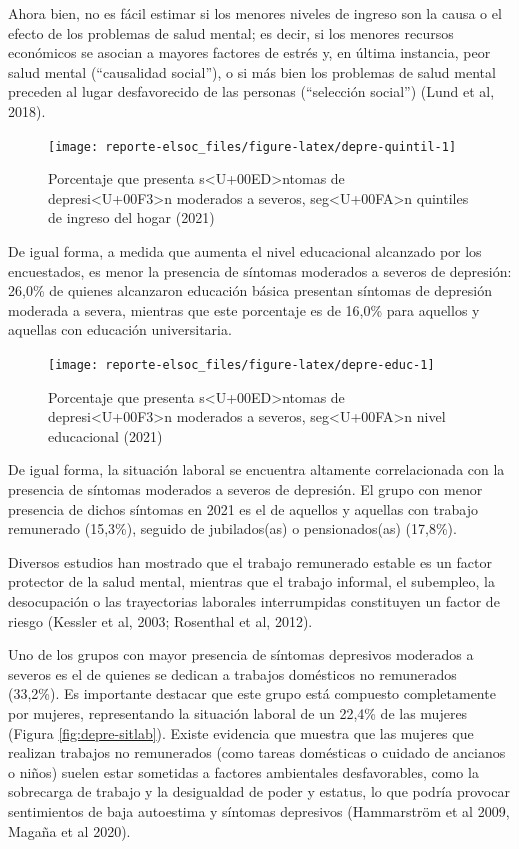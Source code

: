 \documentclass[
  12pt,
]{book}
\begin{document}
Ahora bien, no es fácil estimar si los menores niveles de ingreso son la causa o el efecto de los problemas de salud mental; es decir, si los menores recursos económicos se asocian a mayores factores de estrés y, en última instancia, peor salud mental (``causalidad social''), o si más bien los problemas de salud mental preceden al lugar desfavorecido de las personas (``selección social'') (Lund et al, 2018).

\begin{figure}

{\centering \texttt{[image: reporte-elsoc\_files/figure-latex/depre-quintil-1]} 

}

\caption{Porcentaje que presenta s<U+00ED>ntomas de depresi<U+00F3>n moderados a severos, seg<U+00FA>n quintiles de ingreso del hogar (2021)}\label{fig:depre-quintil}
\end{figure}

De igual forma, a medida que aumenta el nivel educacional alcanzado por los encuestados, es menor la presencia de síntomas moderados a severos de depresión: 26,0\% de quienes alcanzaron educación básica presentan síntomas de depresión moderada a severa, mientras que este porcentaje es de 16,0\% para aquellos y aquellas con educación universitaria.

\begin{figure}

{\centering \texttt{[image: reporte-elsoc\_files/figure-latex/depre-educ-1]} 

}

\caption{Porcentaje que presenta s<U+00ED>ntomas de depresi<U+00F3>n moderados a severos, seg<U+00FA>n nivel educacional (2021)}\label{fig:depre-educ}
\end{figure}

De igual forma, la situación laboral se encuentra altamente correlacionada con la presencia de síntomas moderados a severos de depresión. El grupo con menor presencia de dichos síntomas en 2021 es el de aquellos y aquellas con trabajo remunerado (15,3\%), seguido de jubilados(as) o pensionados(as) (17,8\%).

Diversos estudios han mostrado que el trabajo remunerado estable es un factor protector de la salud mental, mientras que el trabajo informal, el subempleo, la desocupación o las trayectorias laborales interrumpidas constituyen un factor de riesgo (Kessler et al, 2003; Rosenthal et al, 2012).

Uno de los grupos con mayor presencia de síntomas depresivos moderados a severos es el de quienes se dedican a trabajos domésticos no remunerados (33,2\%). Es importante destacar que este grupo está compuesto completamente por mujeres, representando la situación laboral de un 22,4\% de las mujeres (Figura \ref{fig:depre-sitlab}). Existe evidencia que muestra que las mujeres que realizan trabajos no remunerados (como tareas domésticas o cuidado de ancianos o niños) suelen estar sometidas a factores ambientales desfavorables, como la sobrecarga de trabajo y la desigualdad de poder y estatus, lo que podría provocar sentimientos de baja autoestima y síntomas depresivos (Hammarström et al 2009, Magaña et al 2020).
\end{document}
